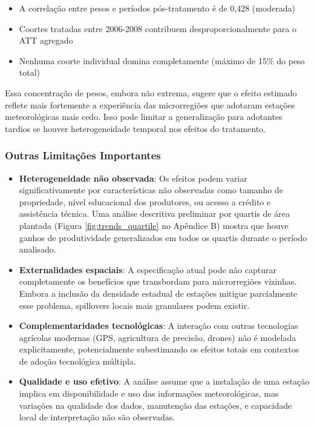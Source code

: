 \documentclass[
	12pt,				%
	oneside,			%
	a4paper,			%
	english,			%
	french,				%
	spanish,			%
	brazil				%
	]{abntex2}
\begin{document}
\begin{itemize}
\item A correlação entre pesos e períodos pós-tratamento é de 0,428 (moderada)
\item Coortes tratadas entre 2006-2008 contribuem desproporcionalmente para o ATT agregado
\item Nenhuma coorte individual domina completamente (máximo de 15\% do peso total)
\end{itemize}

Essa concentração de pesos, embora não extrema, sugere que o efeito estimado reflete mais fortemente a experiência das microrregiões que adotaram estações meteorológicas mais cedo. Isso pode limitar a generalização para adotantes tardios se houver heterogeneidade temporal nos efeitos do tratamento.

\subsubsection{Outras Limitações Importantes}

\begin{itemize}
\item \textbf{Heterogeneidade não observada}: Os efeitos podem variar significativamente por características não observadas como tamanho de propriedade, nível educacional dos produtores, ou acesso a crédito e assistência técnica. Uma análise descritiva preliminar por quartis de área plantada (Figura \ref{fig:trends_quartile} no Apêndice B) mostra que houve ganhos de produtividade generalizados em todos os quartis durante o período analisado.

\item \textbf{Externalidades espaciais}: A especificação atual pode não capturar completamente os benefícios que transbordam para microrregiões vizinhas. Embora a inclusão da densidade estadual de estações mitigue parcialmente esse problema, spillovers locais mais granulares podem existir.

\item \textbf{Complementaridades tecnológicas}: A interação com outras tecnologias agrícolas modernas (GPS, agricultura de precisão, drones) não é modelada explicitamente, potencialmente subestimando os efeitos totais em contextos de adoção tecnológica múltipla.

\item \textbf{Qualidade e uso efetivo}: A análise assume que a instalação de uma estação implica em disponibilidade e uso das informações meteorológicas, mas variações na qualidade dos dados, manutenção das estações, e capacidade local de interpretação não são observadas.
\end{itemize}
\end{document}

